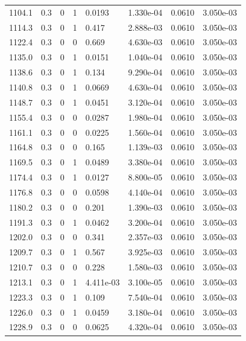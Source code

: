 \documentclass[preview]{standalone}
\begin{document}
{{{{{{\begin{tabular}{L{1.2cm}C{1.2cm} C{0.3cm}C{0.5cm} C{1.4cm}C{1.4cm} C{1.4cm}C{1.4cm}}
  1104.1  &   0.3  & 0     &  1 &  0.0193  & 1.330e-04  & 0.0610 &  3.050e-03   \\ 
  1114.3  &   0.3  & 0     &  1 &  0.417  & 2.888e-03  & 0.0610 &  3.050e-03   \\ 
  1122.4  &   0.3  & 0     &  0 &  0.669  & 4.630e-03  & 0.0610 &  3.050e-03   \\ 
  1135.0  &   0.3  & 0     &  1 &  0.0151  & 1.040e-04  & 0.0610 &  3.050e-03   \\ 
  1138.6  &   0.3  & 0     &  1 &  0.134  & 9.290e-04  & 0.0610 &  3.050e-03   \\ 
  1140.8  &   0.3  & 0     &  1 &  0.0669  & 4.630e-04  & 0.0610 &  3.050e-03   \\ 
  1148.7  &   0.3  & 0     &  1 &  0.0451  & 3.120e-04  & 0.0610 &  3.050e-03   \\ 
  1155.4  &   0.3  & 0     &  0 &  0.0287  & 1.980e-04  & 0.0610 &  3.050e-03   \\ 
  1161.1  &   0.3  & 0     &  0 &  0.0225  & 1.560e-04  & 0.0610 &  3.050e-03   \\ 
  1164.8  &   0.3  & 0     &  0 &  0.165  & 1.139e-03  & 0.0610 &  3.050e-03   \\ 
  1169.5  &   0.3  & 0     &  1 &  0.0489  & 3.380e-04  & 0.0610 &  3.050e-03   \\ 
  1174.4  &   0.3  & 0     &  1 &  0.0127  & 8.800e-05  & 0.0610 &  3.050e-03   \\ 
  1176.8  &   0.3  & 0     &  0 &  0.0598  & 4.140e-04  & 0.0610 &  3.050e-03   \\ 
  1180.2  &   0.3  & 0     &  0 &  0.201  & 1.390e-03  & 0.0610 &  3.050e-03   \\ 
  1191.3  &   0.3  & 0     &  1 &  0.0462  & 3.200e-04  & 0.0610 &  3.050e-03   \\ 
  1202.0  &   0.3  & 0     &  0 &  0.341  & 2.357e-03  & 0.0610 &  3.050e-03   \\ 
  1209.7  &   0.3  & 0     &  1 &  0.567  & 3.925e-03  & 0.0610 &  3.050e-03   \\ 
  1210.7  &   0.3  & 0     &  0 &  0.228  & 1.580e-03  & 0.0610 &  3.050e-03   \\ 
  1213.1  &   0.3  & 0     &  1 &  4.411e-03  & 3.100e-05  & 0.0610 &  3.050e-03   \\ 
  1223.3  &   0.3  & 0     &  1 &  0.109  & 7.540e-04  & 0.0610 &  3.050e-03   \\ 
  1226.0  &   0.3  & 0     &  1 &  0.0459  & 3.180e-04  & 0.0610 &  3.050e-03   \\ 
  1228.9  &   0.3  & 0     &  0 &  0.0625  & 4.320e-04  & 0.0610 &  3.050e-03   \\ 

\end{tabular}}}}}}}
\end{document}

